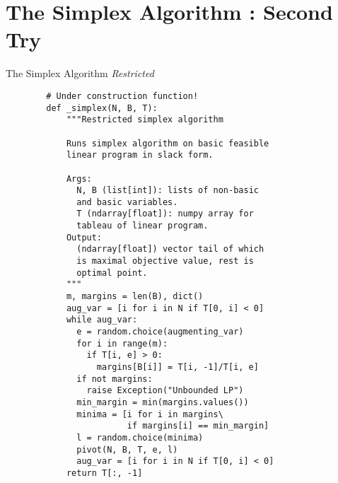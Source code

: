 \documentclass[aspectratio = 169]{beamer}
\begin{document}
\section{The Simplex Algorithm : Second Try}

\begin{frame}[fragile]{The Simplex Algorithm \emph{Restricted}}
  \begin{overlayarea}{1.1\textwidth}{.75\textheight}
  \setlength{\columnsep}{-10pt}
  \begin{multicols}{2}
    \scriptsize{
      \begin{verbatim}
        # Under construction function!
        def _simplex(N, B, T):
            """Restricted simplex algorithm

            Runs simplex algorithm on basic feasible
            linear program in slack form.

            Args:
              N, B (list[int]): lists of non-basic
              and basic variables.
              T (ndarray[float]): numpy array for
              tableau of linear program.
            Output:
              (ndarray[float]) vector tail of which
              is maximal objective value, rest is
              optimal point.
            """
            m, margins = len(B), dict()
            aug_var = [i for i in N if T[0, i] < 0]
            while aug_var:
              e = random.choice(augmenting_var)
              for i in range(m):
                if T[i, e] > 0:
                  margins[B[i]] = T[i, -1]/T[i, e]
              if not margins:
                raise Exception("Unbounded LP")
              min_margin = min(margins.values())
              minima = [i for i in margins\
                        if margins[i] == min_margin]
              l = random.choice(minima)
              pivot(N, B, T, e, l)
              aug_var = [i for i in N if T[0, i] < 0]
            return T[:, -1]
      \end{verbatim}
    }
  \end{multicols}
  \end{overlayarea}
\end{frame}
\end{document}
